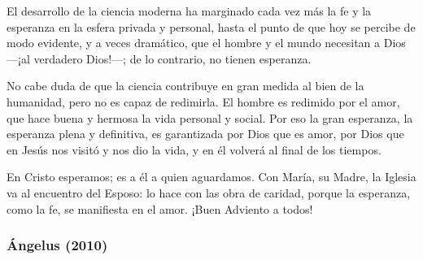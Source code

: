 \begin{body}
	El desarrollo de la ciencia moderna ha marginado cada vez más la fe y la esperanza en la esfera privada y personal, hasta el punto de que hoy se percibe de modo evidente, y a veces dramático, que el hombre y el mundo necesitan a Dios ---¡al verdadero Dios!---; de lo contrario, no tienen esperanza. 
	
	No cabe duda de que la ciencia contribuye en gran medida al bien de la humanidad, pero no es capaz de redimirla. El hombre es redimido por el amor, que hace buena y hermosa la vida personal y social. Por eso la gran esperanza, la esperanza plena y definitiva, es garantizada por Dios que es amor, por Dios que en Jesús nos visitó y nos dio la vida, y en él volverá al final de los tiempos. 
	
	En Cristo esperamos; es a él a quien aguardamos. Con María, su Madre, la Iglesia va al encuentro del Esposo: lo hace con las obra de caridad, porque la esperanza, como la fe, se manifiesta en el amor. ¡Buen Adviento a todos!
\end{body}

\subsubsection{Ángelus (2010)}


